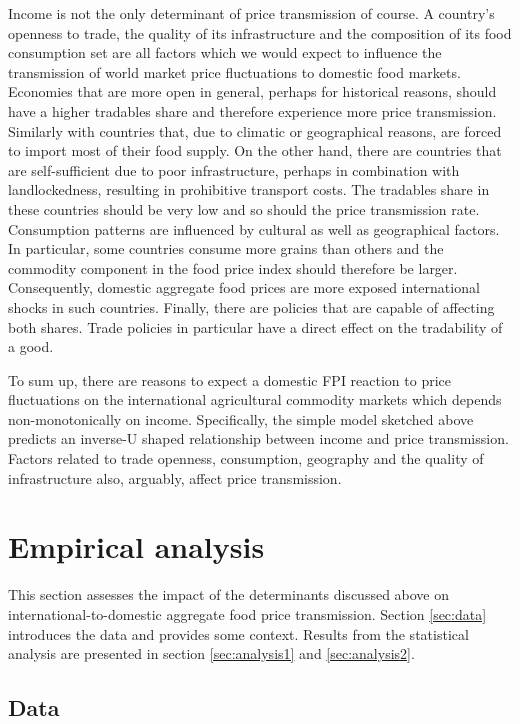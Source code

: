 \documentclass[12pt,english]{article}
\begin{document}
Income is not the only determinant of price transmission of course. A country's openness to trade, the quality of its infrastructure and the composition of its food consumption set are all factors which we would expect to influence the transmission of world market price fluctuations to domestic food markets. Economies that are more open in general, perhaps for historical reasons, should have a higher tradables share and therefore experience more price transmission. Similarly with countries that, due to climatic or geographical reasons, are forced to import most of their food supply. On the other hand, there are countries that are self-sufficient due to poor infrastructure, perhaps in combination with landlockedness, resulting in prohibitive transport costs. The tradables share in these countries should be very low and so should the price transmission rate. Consumption patterns are influenced by cultural as well as geographical factors. In particular, some countries consume more grains than others and the commodity component in the food price index should therefore be larger. Consequently, domestic aggregate food prices are more exposed international shocks in such countries. Finally, there are policies that are capable of affecting both shares. Trade policies in particular have a direct effect on the tradability of a good.

To sum up, there are reasons to expect a domestic FPI reaction to price fluctuations on the international agricultural commodity markets which depends non-monotonically on income. Specifically, the simple model sketched above predicts an inverse-U shaped relationship between income and price transmission. Factors related to trade openness, consumption, geography and the quality of infrastructure also, arguably, affect price transmission. 

\section{Empirical analysis\label{sec:analysis}}
This section assesses the impact of the determinants discussed above on international-to-domestic aggregate food price transmission. Section \ref{sec:data} introduces the data and provides some context. Results from the statistical analysis are presented in section \ref{sec:analysis1} and \ref{sec:analysis2}.

\subsection{Data\label{sec:data}}
\end{document}
